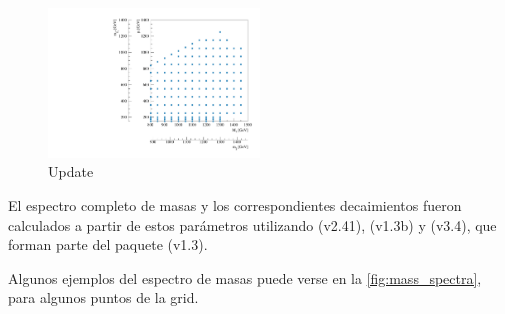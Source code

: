 \begin{figure}[!ht]
  \centering
  \includegraphics[width=0.5\textwidth]{figures/run1_grid}
  \caption{Update}
  \label{fig:gridpoints}
\end{figure}


El espectro completo de masas y los correspondientes decaimientos fueron
calculados a partir de estos parámetros utilizando {\suspect}
(v2.41)\cite{Djouadi2007426}, {\sdecay} (v1.3b)\cite{Muhlleitner:2004mka} y
{\hdecay} (v3.4)\cite{Djouadi:1997yw}, que forman parte del paquete {\susyhit}
(v1.3)\cite{Djouadi:2006bz}.


Algunos ejemplos del espectro de masas puede verse en la
\cref{fig:mass_spectra}, para algunos puntos de la grid.

